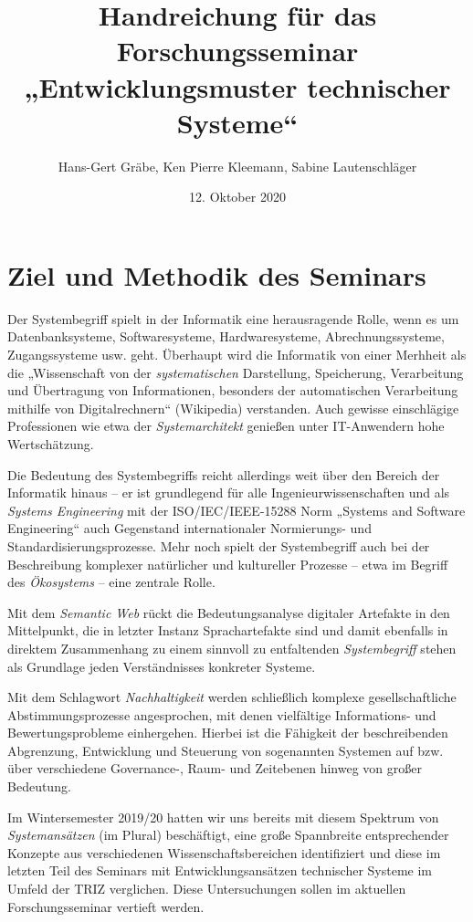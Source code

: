 \documentclass[11pt,a4paper]{article}
\title{Handreichung für das Forschungsseminar\\ „Entwicklungsmuster
  technischer Systeme“}
\author{Hans-Gert Gr\"abe, Ken Pierre Kleemann, Sabine Lautenschläger}
\date{12. Oktober 2020}
\begin{document}
\maketitle

\section{Ziel und Methodik des Seminars}

Der Systembegriff spielt in der Informatik eine herausragende Rolle, wenn es
um Datenbanksysteme, Softwaresysteme, Hardwaresysteme, Abrechnungssysteme,
Zugangssysteme usw. geht.  Überhaupt wird die Informatik von einer Merhheit
als die „Wissenschaft von der \emph{systematischen} Darstellung, Speicherung,
Verarbeitung und Übertragung von Informationen, besonders der automatischen
Verarbeitung mithilfe von Digitalrechnern“ (Wikipedia) verstanden.  Auch
gewisse einschlägige Professionen wie etwa der \emph{Systemarchitekt} genießen
unter IT-Anwendern hohe Wertschätzung.

Die Bedeutung des Systembegriffs reicht allerdings weit über den Bereich der
Informatik hinaus -- er ist grundlegend für alle Ingenieurwissenschaften und
als \emph{Systems Engineering} mit der ISO/IEC/IEEE-15288 Norm „Systems and
Software Engineering“ auch Gegenstand internationaler Normierungs- und
Standardisierungsprozesse.  Mehr noch spielt der Systembegriff auch bei der
Beschreibung komplexer natürlicher und kultureller Prozesse -- etwa im Begriff
des \emph{Ökosystems} -- eine zentrale Rolle.

Mit dem \emph{Semantic Web} rückt die Bedeutungsanalyse digitaler Artefakte in
den Mittelpunkt, die in letzter Instanz Sprachartefakte sind und damit
ebenfalls in direktem Zusammenhang zu einem sinnvoll zu entfaltenden
\emph{Systembegriff} stehen als Grundlage jeden Verständnisses konkreter
Systeme.

Mit dem Schlagwort \emph{Nachhaltigkeit} werden schließlich komplexe
gesellschaftliche Abstimmungsprozesse angesprochen, mit denen vielfältige
Informations- und Bewertungsprobleme einhergehen. Hierbei ist die Fähigkeit
der beschreibenden Abgrenzung, Entwicklung und Steuerung von sogenannten
Systemen auf bzw. über verschiedene Governance-, Raum- und Zeitebenen hinweg
von großer Bedeutung.

Im Wintersemester 2019/20 hatten wir uns bereits mit diesem Spektrum von
\emph{Systemansätzen} (im Plural) beschäftigt, eine große Spannbreite
entsprechender Konzepte aus verschiedenen Wissenschaftsbereichen identifiziert
und diese im letzten Teil des Seminars mit Entwicklungsansätzen technischer
Systeme im Umfeld der TRIZ verglichen.  Diese Untersuchungen sollen im
aktuellen Forschungsseminar vertieft werden.
\newpage
\end{document}
